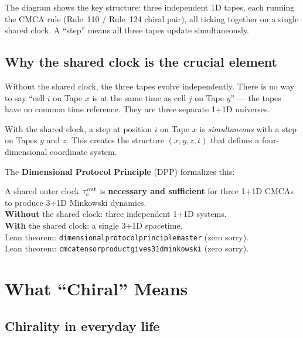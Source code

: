 \documentclass[11pt,a4paper]{article}
\newcommand{\term}[1]{\textbf{#1}}
\newcommand{\lean}[1]{%
  \penalty-100
  \begingroup\def\_{\textunderscore\allowbreak}\texttt{#1}\endgroup}
\newcommand{\CatAL}{\ensuremath{\mathbf{A}_{\rm Lean}}}
\begin{document}
\noindent
The diagram shows the key structure: three independent 1D tapes, each running
the CMCA rule (Rule~110 / Rule~124 chiral pair), all ticking together on
a single shared clock.  A ``step'' means all three tapes update simultaneously.

\subsection{Why the shared clock is the crucial element}

Without the shared clock, the three tapes evolve independently.  There
is no way to say ``cell $i$ on Tape $x$ is at the same time as cell $j$ on
Tape $y$'' --- the tapes have no common time reference.  They are
three separate 1+1D universes.

With the shared clock, a step at position $i$ on Tape $x$ is
\emph{simultaneous} with a step on Tapes $y$ and $z$.  This creates the
structure $(x, y, z, t)$ that defines a four-dimensional coordinate system.

The \term{Dimensional Protocol Principle} (DPP) formalizes this:

\begin{tcolorbox}[colback=boxgreen,colframe=green!50!black,
  title=Dimensional Protocol Principle (DPP) --- Machine-Certified (\CatAL)]
A shared outer clock $\tau_c^{\rm out}$ is \textbf{necessary and sufficient}
for three 1+1D CMCAs to produce 3+1D Minkowski dynamics.\\[4pt]
\textbf{Without} the shared clock: three independent 1+1D systems.\\
\textbf{With} the shared clock: a single 3+1D spacetime.\\[4pt]
Lean theorem: \lean{dimensional\_protocol\_principle\_master} (zero sorry).\\
Lean theorem: \lean{cmca\_tensor\_product\_gives\_31d\_minkowski} (zero sorry).
\end{tcolorbox}

\section{What ``Chiral'' Means}
\label{sec:chiral}

\subsection{Chirality in everyday life}
\end{document}
